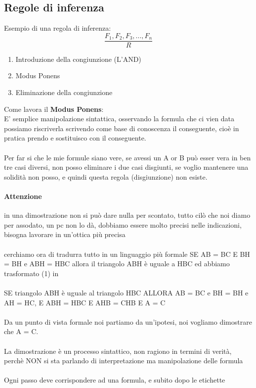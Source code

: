 \documentclass[12pt, a4paper, openany, oneside]{book}
\begin{document}
\subsection{Regole di inferenza}
Esempio di una regola di inferenza:
\[
\frac{F_{1}, F_{2}, F_{3}, ..., F_{n}}{R}
\]
\begin{enumerate}
	\item Introduzione della congiunzione (L'AND)
	\item Modus Ponens
	\item Eliminazione della congiunzione
\end{enumerate}
Come lavora il \textbf{Modus Ponens}: \\
E' semplice manipolazione sintattica, osservando la formula che ci vien data
possiamo riscriverla scrivendo come base di conoscenza il conseguente, 
cioè in pratica prendo e sostituisco con il conseguente.
\\ \\
Per far si che le mie formule siano vere, se avessi un A or B può esser vera in 
ben tre casi diversi, non posso eliminare i due casi disgiunti, se voglio 
mantenere una solidità non posso, e quindi questa regola (disgiunzione) non 
esiste.
\paragraph{Attenzione} in una dimostrazione non si può dare nulla per 
scontato, tutto cilò che noi diamo per assodato, un pc non lo dà, dobbiamo 
essere molto precisi nelle indicazioni, bisogna lavorare in un'ottica più 
precisa
\\ \\
cerchiamo ora di tradurra tutto in un linguaggio più formale
SE AB = BC E BH = BH e ABH = HBC allora il triangolo ABH è uguale a HBC 
ed abbiamo trasformato (1) in \\ \\
SE triangolo ABH è uguale al triangolo HBC ALLORA AB = BC e BH = BH e AH = HC,
E ABH = HBC E AHB = CHB E A = C
\\ \\
Da un punto di vista formale noi partiamo da un'ipotesi, noi vogliamo 
dimostrare che A = C.
\\ \\
La dimostrazione è un processo sintattico, non ragiono in termini di verità, 
perchè NON si sta parlando di interpretazione ma manipolazione delle formula
\\ \\
Ogni passo deve corrispondere ad una formula, e subito dopo le etichette
\end{document}

